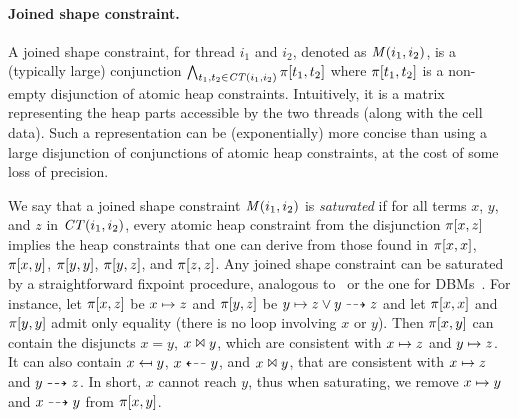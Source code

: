 \paragraph{Joined shape constraint.}
A joined shape constraint, for thread $i_1$ and
$i_2$, denoted as ${\it M}(i_1,i_2)$, is a (typically large)
conjunction %
$\mathop\bigwedge_{t_1,t_2\in {\it CT}(i_1,i_2)}
\pi[t_1,t_2]$ %
where $\pi[t_1,t_2]$ is a non-empty
disjunction of atomic heap constraints. %
%
Intuitively, it is a matrix representing the heap parts accessible by
the two threads (along with the cell data). Such a representation can
be (exponentially) more concise than using a large disjunction of
conjunctions of atomic heap constraints, at the cost of some loss of
precision.

We say that a joined shape constraint ${\it M}(i_1,i_2)$ is {\em
  saturated} if for all terms $x$, $y$, and $z$ in
${\it CT}(i_1,i_2)$, every atomic heap constraint from the disjunction 
$\pi[x,z]$ implies the heap constraints that one can derive from
those found in $\pi[x,x]$, $\pi[x,y]$, $\pi[y,y]$,
$\pi[y,z]$, and $\pi[z,z]$. %
Any joined shape constraint can be saturated by a straightforward
fixpoint procedure, analogous to~\cite{BiRa:vmcai06} or the one for
DBMs~\cite{Dill:DBM}.
%
For instance, let $\pi[x,z]$ be $x\mapsto z$ and
$\pi[y,z]$ be $y\mapsto z \lor y\dashrightarrow z$ and let
$\pi[x,x]$ and $\pi[y,y]$ admit only equality (there is no
loop involving $x$ or $y$). %
Then $\pi[x,y]$ can contain the disjuncts $x = y$, $x\Join
y$, which are consistent with $x\mapsto z$ and $y\mapsto z$. It
can also contain $x\mapsfrom y$, $x\dashleftarrow y$, and $x\Join
y$, that are consistent with $x\mapsto z$ and $y\dashrightarrow z$. %
In short, $x$ cannot reach $y$, thus when saturating, we remove
$x\mapsto y$ and $x\dashrightarrow y$ from $\pi[x,y]$.
%

